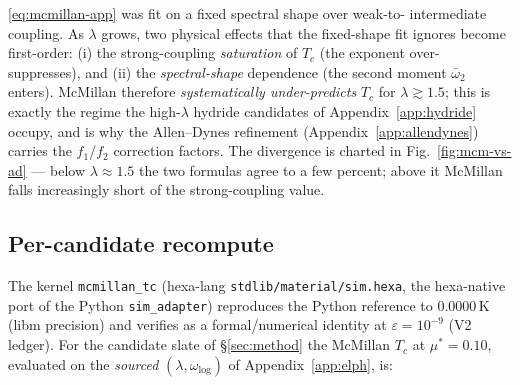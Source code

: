 \eqref{eq:mcmillan-app} was fit on a fixed spectral shape over weak-to-
intermediate coupling. As $\lambda$ grows, two physical effects that the
fixed-shape fit ignores become first-order: (i) the strong-coupling
\emph{saturation} of $T_c$ (the exponent over-suppresses), and (ii) the
\emph{spectral-shape} dependence (the second moment $\bar\omega_2$ enters).
McMillan therefore \emph{systematically under-predicts} $T_c$ for
$\lambda\!\gtrsim\!1.5$; this is exactly the regime the high-$\lambda$
hydride candidates of Appendix~\ref{app:hydride} occupy, and is why the
Allen--Dynes refinement (Appendix~\ref{app:allendynes}) carries the
$f_1$/$f_2$ correction factors. The divergence is charted in
Fig.~\ref{fig:mcm-vs-ad} --- below $\lambda\!\approx\!1.5$ the two
formulas agree to a few percent; above it McMillan falls increasingly
short of the strong-coupling value.

\subsection{Per-candidate recompute}
\label{app:mcmillan-recompute}

The kernel \texttt{mcmillan\_tc} (hexa-lang \texttt{stdlib/material/sim.hexa},
the hexa-native port of the Python \texttt{sim\_adapter}) reproduces the
Python reference to $0.0000$\,K (libm precision) and verifies as a
formal/numerical identity at $\varepsilon=10^{-9}$ (V2 ledger). For the
candidate slate of \S\ref{sec:method} the McMillan $T_c$ at $\mu^{*}=0.10$,
evaluated on the \emph{sourced} $(\lambda,\omega_{\log})$ of
Appendix~\ref{app:elph}, is:

